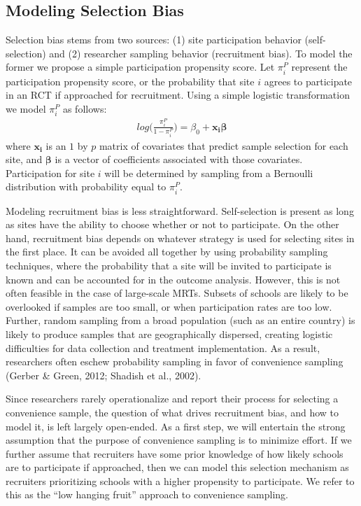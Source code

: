 \documentclass[english,man,floatsintext]{apa6}
\begin{document}
\hypertarget{modeling-selection-bias}{%
\subsection{Modeling Selection Bias}\label{modeling-selection-bias}}

Selection bias stems from two sources: (1) site participation behavior (self-selection) and (2) researcher sampling behavior (recruitment bias). To model the former we propose a simple participation propensity score. Let \(\pi^P_i\) represent the participation propensity score, or the probability that site \(i\) agrees to participate in an RCT if approached for recruitment. Using a simple logistic transformation we model \(\pi^P_i\) as follows:
\begin{align} 
\label{eq:RGM}
log\bigg(\frac{\pi^P_i}{1 - \pi^P_i}\bigg) = \beta_0 + \boldsymbol{x_i \beta}
\end{align}
where \(\boldsymbol{x_i}\) is an \(1\) by \(p\) matrix of covariates that predict sample selection for each site, and \(\boldsymbol{\beta}\) is a vector of coefficients associated with those covariates. Participation for site \(i\) will be determined by sampling from a Bernoulli distribution with probability equal to \(\pi^P_i\).

Modeling recruitment bias is less straightforward. Self-selection is present as long as sites have the ability to choose whether or not to participate. On the other hand, recruitment bias depends on whatever strategy is used for selecting sites in the first place. It can be avoided all together by using probability sampling techniques, where the probability that a site will be invited to participate is known and can be accounted for in the outcome analysis. However, this is not often feasible in the case of large-scale MRTs. Subsets of schools are likely to be overlooked if samples are too small, or when participation rates are too low. Further, random sampling from a broad population (such as an entire country) is likely to produce samples that are geographically dispersed, creating logistic difficulties for data collection and treatment implementation. As a result, researchers often eschew probability sampling in favor of convenience sampling (Gerber \& Green, 2012; Shadish et al., 2002).

Since researchers rarely operationalize and report their process for selecting a convenience sample, the question of what drives recruitment bias, and how to model it, is left largely open-ended. As a first step, we will entertain the strong assumption that the purpose of convenience sampling is to minimize effort. If we further assume that recruiters have some prior knowledge of how likely schools are to participate if approached, then we can model this selection mechanism as recruiters prioritizing schools with a higher propensity to participate. We refer to this as the \enquote{low hanging fruit} approach to convenience sampling.
\end{document}
